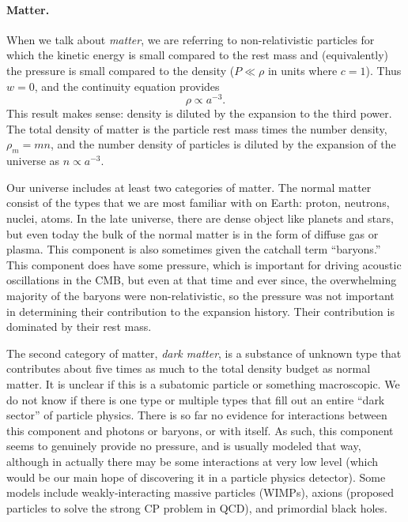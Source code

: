 \paragraph{Matter.}  When we talk about \textit{matter}, we are referring to non-relativistic particles for which the kinetic energy is small compared to the rest mass and (equivalently) the pressure is small compared to the density ($P \ll \rho$ in units where $c=1$).  Thus $w=0$, and the continuity equation provides
\begin{equation}\rho \propto a^{-3}.\end{equation}
This result makes sense: density is diluted by the expansion to the third power.  The total density of matter is the particle rest mass times the number density, $\rho_m = mn$, and the number density of particles is diluted by the expansion of the universe as $n \propto a^{-3}$.

Our universe includes at least two categories of matter.  The normal matter consist of the types that we are most familiar with on Earth: proton, neutrons, nuclei, atoms.  In the late universe, there are dense object like planets and stars, but even today the bulk of the normal matter is in the form of diffuse gas or plasma.  This component is also sometimes given the catchall term ``baryons.''  This component does have some pressure, which is important for driving acoustic oscillations in the CMB, but even at that time and ever since, the overwhelming majority of the baryons were non-relativistic, so the pressure was not important in determining their contribution to the expansion history.  Their contribution is dominated by their rest mass.

The second category of matter, \textit{dark matter}, is a substance of unknown type that contributes about five times as much to the total density budget as normal matter.  It is unclear if this is a subatomic particle or something macroscopic.  We do not know if there is one type or multiple types that fill out an entire ``dark sector'' of particle physics.  There is so far no evidence for interactions between this component and photons or baryons, or with itself.  As such, this component seems to genuinely provide no pressure, and is usually modeled that way, although in actually there may be some interactions at very low level (which would be our main hope of discovering it in a particle physics detector).  Some models include weakly-interacting massive particles (WIMPs), axions (proposed particles to solve the strong CP problem in QCD), and primordial black holes.

